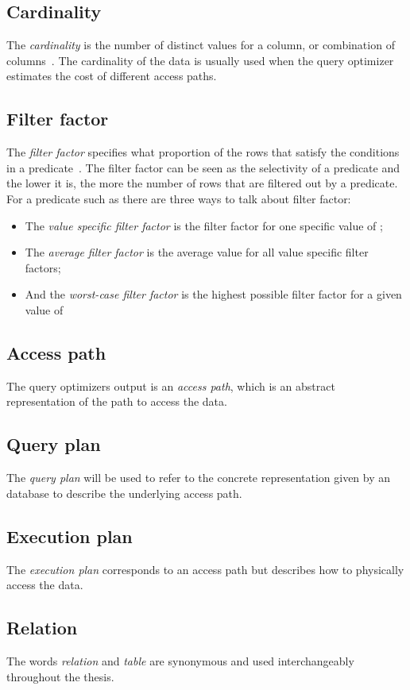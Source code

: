\subsection*{Cardinality}
The \textit{cardinality} is the number of distinct values for a column, or
combination of columns~\cite{lahdenmaki_2005_relational_rdidatodossea}. The
cardinality of the data is usually used when the query optimizer estimates the
cost of different access paths.

\subsection*{Filter factor}
The \textit{filter factor} specifies what proportion of the rows that    satisfy
the conditions in a predicate~\cite{lahdenmaki_2005_relational_rdidatodossea}.
The filter factor can be seen as the selectivity of a predicate and the lower it
is, the more the number of rows that are filtered out by a predicate. For a
predicate such as  there are three ways to talk about
filter factor:
\begin{itemize}
\item The \textit{value specific filter factor} is the filter factor for one
  specific value of ;
\item The \textit{average filter factor} is the average value for all value
  specific filter factors;
\item And the \textit{worst-case filter factor} is the highest possible filter
  factor for a given value of 
\end{itemize}

\subsection*{Access path}
The query optimizers output is an \textit{access path}, which is an abstract
representation of the path to access the data.

\subsection*{Query plan}
The \textit{query plan} will be used to refer to the concrete representation
given by an database to describe the underlying access path.

\subsection*{Execution plan}
The \textit{execution plan} corresponds to an access path but describes how to
physically access the data.

\subsection*{Relation}
The words \textit{relation} and \textit{table} are synonymous and used
interchangeably throughout the thesis.